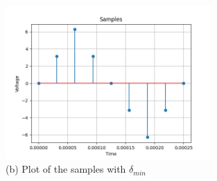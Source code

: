 \documentclass[journal,12pt,onecolumn]{IEEEtran}
\theoremstyle{remark}
\begin{document}
	\begin{figure}[htbp]
		\centering
		\includegraphics[width=0.7\textwidth]{2021/EC/24/figs/Figure_1.png}
		\caption*{(b) Plot of the samples with $\delta_{min}$}
	\end{figure}
\end{document}
